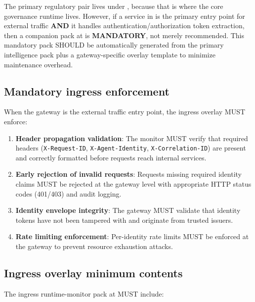 The primary regulatory pair lives under ,
because that is where the core governance runtime lives. However, if a
service in  is the primary entry
point for external traffic \textbf{AND} it handles
authentication/authorization token extraction, then a companion pack at
 is
\textbf{MANDATORY}, not merely recommended. This mandatory pack SHOULD be
automatically generated from the primary intelligence pack plus a
gateway-specific overlay template to minimize maintenance overhead.

\subsection{Mandatory ingress enforcement}

When the gateway is the external traffic entry point, the ingress
overlay MUST enforce:

\begin{enumerate}
  \item \textbf{Header propagation validation}: The monitor MUST verify
    that required headers (\texttt{X-Request-ID}, \texttt{X-Agent-Identity},
    \texttt{X-Correlation-ID}) are present and correctly formatted before
    requests reach internal services.
  \item \textbf{Early rejection of invalid requests}: Requests missing
    required identity claims MUST be rejected at the gateway level with
    appropriate HTTP status codes (401/403) and audit logging.
  \item \textbf{Identity envelope integrity}: The gateway MUST validate
    that identity tokens have not been tampered with and originate from
    trusted issuers.
  \item \textbf{Rate limiting enforcement}: Per-identity rate limits
    MUST be enforced at the gateway to prevent resource exhaustion attacks.
\end{enumerate}

\subsection{Ingress overlay minimum contents}

The ingress runtime-monitor pack at
 MUST
include:

